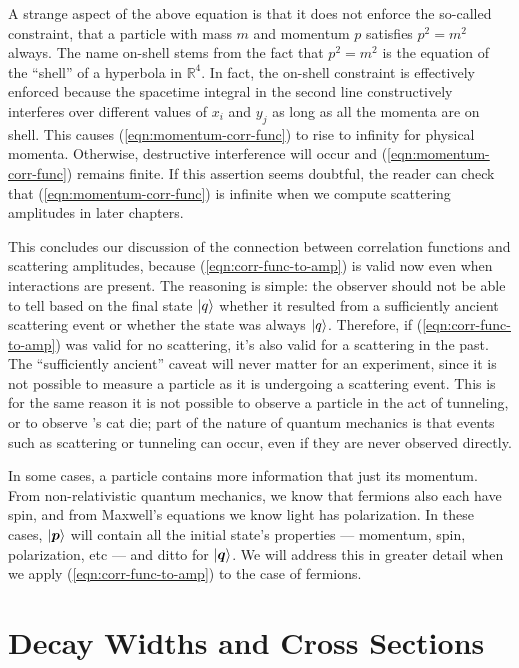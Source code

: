 A strange aspect of the above equation is that it does not enforce the so-called  constraint, that a particle with mass $m$ and momentum $p$ satisfies $p^2 = m^2$ always. The name on-shell stems from the fact that $p^2 = m^2$ is the equation of the ``shell'' of a hyperbola in $\mathds{R}^4$. In fact, the on-shell constraint is effectively enforced because the spacetime integral in the second line constructively interferes over different values of $x_i$ and $y_j$ as long as all the momenta are on shell. This causes (\ref{eqn:momentum-corr-func}) to rise to infinity for physical momenta. Otherwise, destructive interference will occur and (\ref{eqn:momentum-corr-func}) remains finite. If this assertion seems doubtful, the reader can check that (\ref{eqn:momentum-corr-func}) is infinite when we compute scattering amplitudes in later chapters.

This concludes our discussion of the connection between correlation functions and scattering amplitudes, because (\ref{eqn:corr-func-to-amp}) is valid now even when interactions are present. The reasoning is simple: the observer should not be able to tell based on the final state $\ket{q}$ whether it resulted from a sufficiently ancient scattering event or whether the state was always $\ket{q}$. Therefore, if (\ref{eqn:corr-func-to-amp}) was valid for no scattering, it's also valid for a scattering in the past. The ``sufficiently ancient'' caveat will never matter for an experiment, since it is not possible to measure a particle as it is undergoing a scattering event. This is for the same reason it is not possible to observe a particle in the act of tunneling, or to observe \Schrodinger's cat die; part of the nature of quantum mechanics is that events such as scattering or tunneling can occur, even if they are never observed directly.

In some cases, a particle contains more information that just its momentum. From non-relativistic quantum mechanics, we know that fermions also each have spin, and from Maxwell's equations we know light has polarization. In these cases, $\ket{\bm p}$ will contain all the initial state's properties --- momentum, spin, polarization, etc --- and ditto for $\ket{\bm q}$. We will address this in greater detail when we apply (\ref{eqn:corr-func-to-amp}) to the case of fermions.



\section{Decay Widths and Cross Sections}

